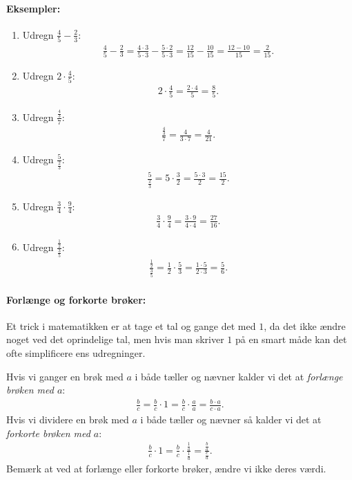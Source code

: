 \paragraph*{Eksempler:}
\begin{enumerate}
\item Udregn $\frac{4}{5}-\frac{2}{3}$:
\begin{align*}
\frac{4}{5}-\frac{2}{3} = \frac{4\cdot 3}{5 \cdot 3} - \frac{5 \cdot 2}{5 \cdot 3} = \frac{12}{15} - \frac{10}{15} = \frac{12-10}{15} = \frac{2}{15}.
\end{align*}
\item Udregn $2 \cdot \frac{4}{5}$:
\begin{align*}
2 \cdot \frac{4}{5}= \frac{2 \cdot 4}{5} = \frac{8}{5}.
\end{align*}
\item Udregn $\frac{\frac{4}{3}}{7}$:
\begin{align*}
\frac{\frac{4}{3}}{7} = \frac{4}{3 \cdot 7} = \frac{4}{21}.
\end{align*}
\item Udregn $\frac{5}{\frac{2}{3}}$:
\begin{align*}
\frac{5}{\frac{2}{3}} = 5 \cdot \frac{3}{2} = \frac{5 \cdot 3}{2} = \frac{15}{2}.
\end{align*}
\item Udregn $\frac{3}{4} \cdot \frac{9}{4}$:
\begin{align*}
\frac{3}{4} \cdot \frac{9}{4} = \frac{3 \cdot 9}{4 \cdot 4} = \frac{27}{16}.
\end{align*}
\item  Udregn $\frac{\frac{1}{2}}{\frac{3}{5}}$:
\begin{align*}
\frac{\frac{1}{2}}{\frac{3}{5}} = \frac{1}{2} \cdot \frac{5}{3} = \frac{1 \cdot 5}{2 \cdot 3} = \frac{5}{6}.
\end{align*}
\end{enumerate}

\paragraph*{Forlænge og forkorte brøker:}
Et trick i matematikken er at tage et tal og gange det med $1$, da det ikke ændre noget ved det oprindelige tal, men hvis man skriver $1$ på en smart måde kan det ofte simplificere ens udregninger. 

Hvis vi ganger en brøk med $a$ i både tæller og nævner kalder vi det at \emph{forlænge brøken med $a$}:
\begin{align*}
\frac{b}{c} = \frac{b}{c} \cdot 1 = \frac{b}{c} \cdot \frac{a}{a} = \frac{b \cdot a}{c \cdot a}.
\end{align*}
Hvis vi dividere en brøk med $a$ i både tæller og nævner så kalder vi det at \emph{forkorte brøken med $a$}:
\begin{align*}
\frac{b}{c} \cdot 1 = \frac{b}{c} \cdot \frac{\frac{1}{a}}{\frac{1}{a}} = \frac{\frac{b}{a}}{\frac{c}{a}}. 
\end{align*}
Bemærk at ved at forlænge eller forkorte brøker, ændre vi ikke deres værdi.
